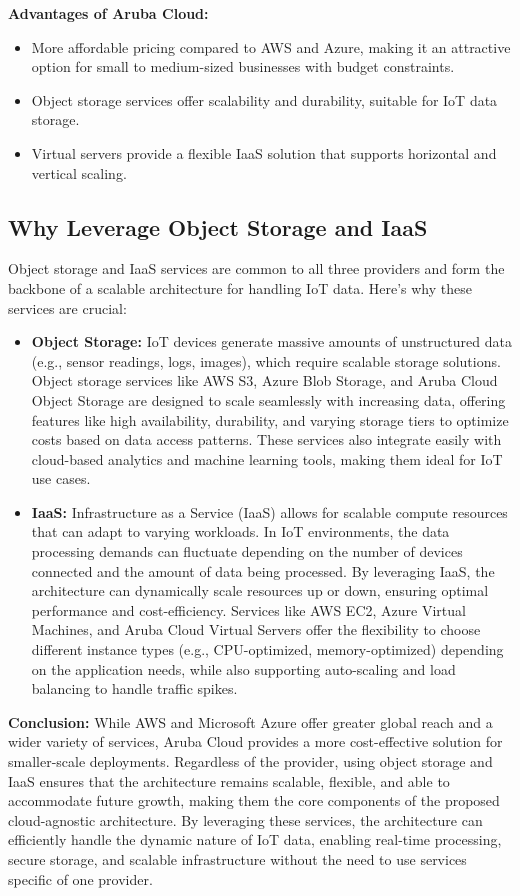 \textbf{Advantages of Aruba Cloud:}
\begin{itemize}
    \item More affordable pricing compared to AWS and Azure, making it an attractive option for small to medium-sized businesses with budget constraints.
    \item Object storage services offer scalability and durability, suitable for IoT data storage.
    \item Virtual servers provide a flexible IaaS solution that supports horizontal and vertical scaling.
\end{itemize}

\subsection*{Why Leverage Object Storage and IaaS}
Object storage and IaaS services are common to all three providers and form the backbone of a scalable architecture for handling IoT data. Here’s why these services are crucial:

\begin{itemize}
    \item \textbf{Object Storage:} IoT devices generate massive amounts of unstructured data (e.g., sensor readings, logs, images), which require scalable storage solutions. Object storage services like AWS S3, Azure Blob Storage, and Aruba Cloud Object Storage are designed to scale seamlessly with increasing data, offering features like high availability, durability, and varying storage tiers to optimize costs based on data access patterns. These services also integrate easily with cloud-based analytics and machine learning tools, making them ideal for IoT use cases.
    
    \item \textbf{IaaS:} Infrastructure as a Service (IaaS) allows for scalable compute resources that can adapt to varying workloads. In IoT environments, the data processing demands can fluctuate depending on the number of devices connected and the amount of data being processed. By leveraging IaaS, the architecture can dynamically scale resources up or down, ensuring optimal performance and cost-efficiency. Services like AWS EC2, Azure Virtual Machines, and Aruba Cloud Virtual Servers offer the flexibility to choose different instance types (e.g., CPU-optimized, memory-optimized) depending on the application needs, while also supporting auto-scaling and load balancing to handle traffic spikes.
\end{itemize}

\textbf{Conclusion:} While AWS and Microsoft Azure offer greater global reach and a wider variety of services, Aruba Cloud provides a more cost-effective solution for smaller-scale deployments. Regardless of the provider, using object storage and IaaS ensures that the architecture remains scalable, flexible, and able to accommodate future growth, making them the core components of the proposed cloud-agnostic architecture. By leveraging these services, the architecture can efficiently handle the dynamic nature of IoT data, enabling real-time processing, secure storage, and scalable infrastructure without the need to use services specific of one provider.

